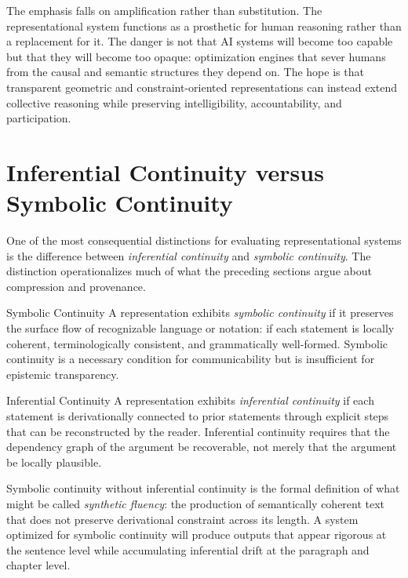 The emphasis falls on amplification rather than substitution. The representational system
functions as a prosthetic for human reasoning rather than a replacement for it. The
danger is not that AI systems will become too capable but that they will become too
opaque: optimization engines that sever humans from the causal and semantic structures
they depend on. The hope is that transparent geometric and constraint-oriented
representations can instead extend collective reasoning while preserving intelligibility,
accountability, and participation.

\section{Inferential Continuity versus Symbolic Continuity}

One of the most consequential distinctions for evaluating representational systems
is the difference between \emph{inferential continuity} and \emph{symbolic
continuity}. The distinction operationalizes much of what the preceding sections
argue about compression and provenance.

\begin{definition}{Symbolic Continuity}
A representation exhibits \emph{symbolic continuity} if it preserves the surface
flow of recognizable language or notation: if each statement is locally coherent,
terminologically consistent, and grammatically well-formed. Symbolic continuity is
a necessary condition for communicability but is insufficient for epistemic
transparency.
\end{definition}

\begin{definition}{Inferential Continuity}
A representation exhibits \emph{inferential continuity} if each statement is
derivationally connected to prior statements through explicit steps that can be
reconstructed by the reader. Inferential continuity requires that the dependency
graph of the argument be recoverable, not merely that the argument be locally
plausible.
\end{definition}

Symbolic continuity without inferential continuity is the formal definition of
what might be called \emph{synthetic fluency}: the production of semantically
coherent text that does not preserve derivational constraint across its length.
A system optimized for symbolic continuity will produce outputs that appear
rigorous at the sentence level while accumulating inferential drift at the
paragraph and chapter level.

